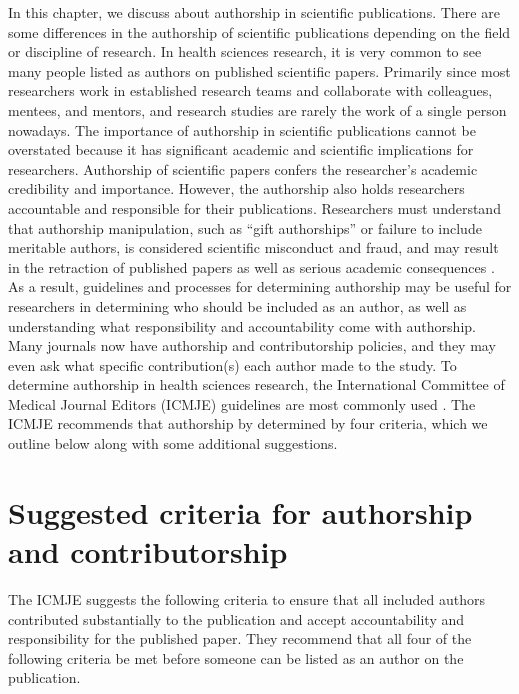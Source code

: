 \documentclass[
]{book}
\begin{document}
In this chapter, we discuss about authorship in scientific publications. There are some differences in the authorship of scientific publications depending on the field or discipline of research. In health sciences research, it is very common to see many people listed as authors on published scientific papers. Primarily since most researchers work in established research teams and collaborate with colleagues, mentees, and mentors, and research studies are rarely the work of a single person nowadays. The importance of authorship in scientific publications cannot be overstated because it has significant academic and scientific implications for researchers. Authorship of scientific papers confers the researcher's academic credibility and importance. However, the authorship also holds researchers accountable and responsible for their publications. Researchers must understand that authorship manipulation, such as ``gift authorships'' or failure to include meritable authors, is considered scientific misconduct and fraud, and may result in the retraction of published papers as well as serious academic consequences \citep{callaway2016publisher}. As a result, guidelines and processes for determining authorship may be useful for researchers in determining who should be included as an author, as well as understanding what responsibility and accountability come with authorship. Many journals now have authorship and contributorship policies, and they may even ask what specific contribution(s) each author made to the study. To determine authorship in health sciences research, the International Committee of Medical Journal Editors (ICMJE) guidelines are most commonly used \citep{international2019icmje}. The ICMJE recommends that authorship by determined by four criteria, which we outline below along with some additional suggestions.

\hypertarget{suggested-criteria-for-authorship-and-contributorship}{%
\section{Suggested criteria for authorship and contributorship}\label{suggested-criteria-for-authorship-and-contributorship}}

The ICMJE suggests the following criteria to ensure that all included authors contributed substantially to the publication and accept accountability and responsibility for the published paper. They recommend that all four of the following criteria be met before someone can be listed as an author on the publication.
\end{document}
